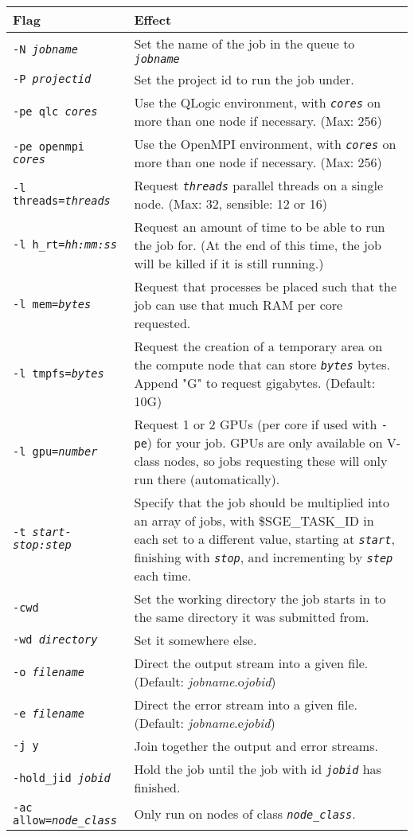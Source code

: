 \documentclass[landscape,a4paper]{article}
\renewcommand{\th}[1]{\textbf{#1}}
\newcommand{\code}[1]{\texttt{#1}}
\newcommand{\codeit}[1]{\texttt{\color{SchemeColour}\emph{#1}}}
\begin{document}
\begin{multicols}{3}
~

{\small \centering
\begin{tabular}{p{2.5cm}p{5cm}}
\hline
\th{Flag} & \th{Effect}\\
\hline
\code{-N }\codeit{jobname} &
Set the name of the job in the queue to \codeit{jobname}
\\
\code{-P }\codeit{projectid} &
Set the project id to run the job under.
\\
\code{-pe qlc }\codeit{cores} & 
Use the QLogic environment, with \codeit{cores} on more than one node if necessary. (Max: 256)
\\
\code{-pe openmpi }\codeit{cores} &
Use the OpenMPI environment, with \codeit{cores} on more than one node if necessary. (Max: 256)
\\
\code{-l threads=}\codeit{threads} &
Request \codeit{threads} parallel threads on a single node. (Max: 32, sensible: 12 or 16)
\\
\code{-l h\_rt=}\codeit{hh:mm:ss} & 
Request an amount of time to be able to run the job for. (At the end of this time, the job will be killed if it is still running.)
\\
\code{-l mem=}\codeit{bytes} & 
Request that processes be placed such that the job can use that much RAM per core requested.
\\
\code{-l tmpfs=}\codeit{bytes} & 
Request the creation of a temporary area on the compute node that can store \codeit{bytes} bytes. Append "G" to request gigabytes. (Default: 10G)
\\
\code{-l gpu=}\codeit{number} &
Request 1 or 2 GPUs (per core if used with \code{-pe}) for your job. GPUs are only available on V-class nodes, so jobs requesting these will only run there (automatically).
\\ 
\code{-t }\codeit{start-stop:step} & 
Specify that the job should be multiplied into an array of jobs, with \$SGE\_TASK\_ID in each set to a different value, starting at \codeit{start}, finishing with \codeit{stop}, and incrementing by \codeit{step} each time.
\\
\code{-cwd} & 
Set the working directory the job starts in to the same directory it was submitted from.
\\
\code{-wd }\codeit{directory} & 
Set it somewhere else.
\\
\code{-o }\codeit{filename} & 
Direct the output stream into a given file. (Default: \textit{jobname}.o\textit{jobid})
\\
\code{-e }\codeit{filename} & 
Direct the error stream into a given file. (Default: \textit{jobname}.e\textit{jobid})
\\
\code{-j y} & 
Join together the output and error streams.
\\
\code{-hold\_jid }\codeit{jobid} & 
Hold the job until the job with id \codeit{jobid} has finished.
\\
\code{-ac allow=}\codeit{node\_class} & 
Only run on nodes of class \codeit{node\_class}.
\\
\hline
\end{tabular}
}



\end{multicols}
\end{document}
